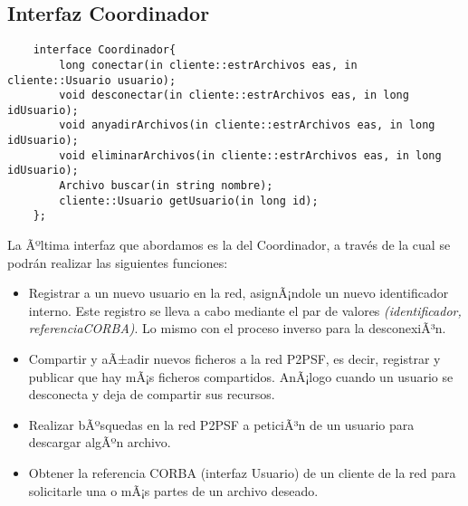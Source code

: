       \subsection{Interfaz Coordinador}
      \begin{center}
         \begin{verbatim}
	interface Coordinador{
		long conectar(in cliente::estrArchivos eas, in cliente::Usuario usuario);
		void desconectar(in cliente::estrArchivos eas, in long idUsuario);
		void anyadirArchivos(in cliente::estrArchivos eas, in long idUsuario);
		void eliminarArchivos(in cliente::estrArchivos eas, in long idUsuario);
		Archivo buscar(in string nombre);
		cliente::Usuario getUsuario(in long id);
	};
         \end{verbatim}
      \end{center} 
      La Ãºltima interfaz que abordamos es la del Coordinador, a través de la cual se podrán realizar las siguientes funciones:
      \begin{itemize}
         \item Registrar a un nuevo usuario en la red, asignÃ¡ndole un nuevo identificador interno. Este registro se lleva a cabo mediante el par de
               valores \textit{(identificador, referenciaCORBA)}. Lo mismo con el proceso inverso para la desconexiÃ³n.
         \item Compartir y aÃ±adir nuevos ficheros a la red P2PSF, es decir, registrar y publicar que hay mÃ¡s ficheros compartidos. AnÃ¡logo cuando un
               usuario se desconecta y deja de compartir sus recursos.
         \item Realizar bÃºsquedas en la red P2PSF a peticiÃ³n de un usuario para descargar algÃºn archivo.
         \item Obtener la referencia CORBA (interfaz Usuario) de un cliente de la red para solicitarle una o mÃ¡s partes de un archivo deseado.
      \end{itemize}



